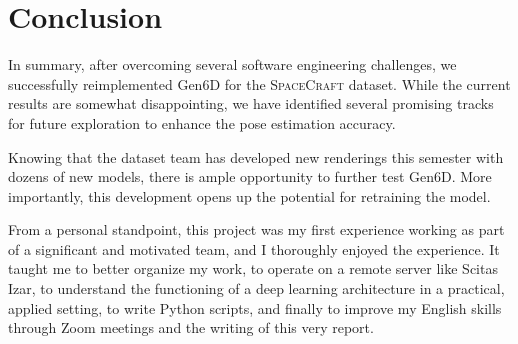 
\chapter{Conclusion}\label{chapter:conclusion}

In summary, after overcoming several software engineering challenges, we successfully reimplemented Gen6D for the \textsc{SpaceCraft} dataset. While the current results are somewhat disappointing, we have identified several promising tracks for future exploration to enhance the pose estimation accuracy.

\bigskip

Knowing that the dataset team has developed new renderings this semester with dozens of new models, there is ample opportunity to further test Gen6D. More importantly, this development opens up the potential for retraining the model. 

\bigskip

From a personal standpoint, this project was my first experience working as part of a significant and motivated team, and I thoroughly enjoyed the experience. It taught me to better organize my work, to operate on a remote server like Scitas Izar, to understand the functioning of a deep learning architecture in a practical, applied setting, to write Python scripts, and finally to improve my English skills through Zoom meetings and the writing of this very report.